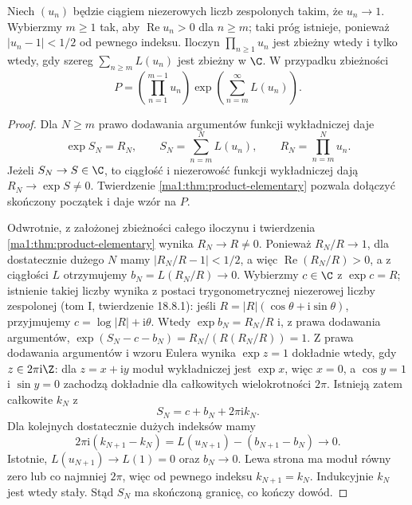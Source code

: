 \begin{twierdzenie}
\label{ma2:thm:complex-log-product}
Niech $(u_n)$ będzie ciągiem niezerowych liczb zespolonych
takim, że $u_n\to1$. Wybierzmy $m\ge1$ tak, aby
$\operatorname{Re}u_n>0$ dla $n\ge m$; taki próg
istnieje, ponieważ $|u_n-1|<1/2$ od pewnego indeksu.
Iloczyn $\prod_{n\ge1}u_n$ jest zbieżny wtedy i tylko wtedy,
gdy szereg $\sum_{n\ge m}L(u_n)$ jest zbieżny w $\C$.
W przypadku zbieżności
\[
 P=\left(\prod_{n=1}^{m-1}u_n\right)
       \exp\left(\sum_{n=m}^{\infty}L(u_n)\right).
\]
\end{twierdzenie}
\begin{proof}
Dla $N\ge m$ prawo dodawania argumentów funkcji
wykładniczej daje
\[
 \exp S_N=R_N,\qquad
 S_N=\sum_{n=m}^N L(u_n),\qquad R_N=\prod_{n=m}^N u_n .
\]
Jeżeli $S_N\to S\in\C$, to ciągłość i niezerowość
funkcji wykładniczej dają $R_N\to\exp S\ne0$. Twierdzenie
\ref{ma1:thm:product-elementary} pozwala dołączyć
skończony początek i daje wzór na $P$.

Odwrotnie, z założonej zbieżności całego iloczynu
i twierdzenia \ref{ma1:thm:product-elementary} wynika
$R_N\to R\ne0$. Ponieważ $R_N/R\to1$, dla dostatecznie
dużego $N$ mamy $|R_N/R-1|<1/2$, a więc
$\operatorname{Re}(R_N/R)>0$,
a z ciągłości $L$ otrzymujemy $b_N=L(R_N/R)\to0$.
Wybierzmy $c\in\C$ z $\exp c=R$; istnienie takiej liczby
wynika z postaci trygonometrycznej niezerowej liczby
zespolonej (tom I, twierdzenie 18.8.1): jeśli
$R=|R|(\cos\theta+\mathrm i\sin\theta)$, przyjmujemy
$c=\log|R|+\mathrm i\theta$.
Wtedy $\exp b_N=R_N/R$ i, z prawa dodawania
argumentów, $\exp(S_N-c-b_N)=R_N/(R(R_N/R))=1$.
Z prawa dodawania argumentów i wzoru Eulera wynika
$\exp z=1$ dokładnie wtedy, gdy $z\in2\pi\mathrm i\Z$:
dla $z=x+\mathrm i y$ moduł wykładniczej jest $\exp x$,
więc $x=0$, a $\cos y=1$ i $\sin y=0$ zachodzą
dokładnie dla całkowitych wielokrotności $2\pi$.
Istnieją zatem całkowite $k_N$ z
\[
 S_N=c+b_N+2\pi\mathrm i k_N .
\]
Dla kolejnych dostatecznie dużych indeksów mamy
\[
 2\pi\mathrm i(k_{N+1}-k_N)
 =L(u_{N+1})-(b_{N+1}-b_N)\longrightarrow0.
\]
Istotnie, $L(u_{N+1})\to L(1)=0$ oraz $b_N\to0$.
Lewa strona ma moduł równy zero lub co najmniej $2\pi$,
więc od pewnego indeksu $k_{N+1}=k_N$. Indukcyjnie
$k_N$ jest wtedy stały. Stąd $S_N$ ma skończoną granicę,
co kończy dowód.
\end{proof}


